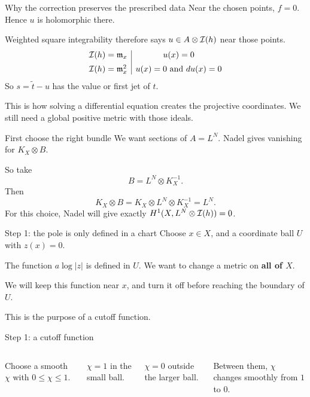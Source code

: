 \begin{frame}{Why the correction preserves the prescribed data}
Near the chosen points, \(f=0\). Hence \(u\) is holomorphic there.
\par\medskip
Weighted square integrability therefore says \(u\in A\otimes\mathcal I(h)\) near those points.
\[
\begin{array}{c|c}
\mathcal I(h)=\mathfrak m_x&u(x)=0\\[5pt]
\mathcal I(h)=\mathfrak m_x^2&u(x)=0\text{ and }du(x)=0
\end{array}
\]
So \(s=\widetilde t-u\) has the value or first jet of \(t\).
\par\medskip
This is how solving a differential equation creates the projective coordinates. We still need a global positive metric with those ideals.
\end{frame}

\begin{frame}{First choose the right bundle}
We want sections of \(A=L^N\). Nadel gives vanishing for \(K_X\otimes B\).
\par\bigskip
So take
\[
B=L^N\otimes K_X^{-1}.
\]
Then
\[
K_X\otimes B=K_X\otimes L^N\otimes K_X^{-1}=L^N.
\]
For this choice, Nadel will give exactly \(H^1(X,L^N\otimes\mathcal I(h))=0\).
\end{frame}

\begin{frame}{Step 1: the pole is only defined in a chart}
Choose \(x\in X\), and a coordinate ball \(U\) with \(z(x)=0\).
\par\bigskip
The function \(a\log|z|\) is defined in \(U\). We want to change a metric on \textbf{all of \(X\)}.
\par\bigskip
We will keep this function near \(x\), and turn it off before reaching the boundary of \(U\).
\par\medskip
This is the purpose of a cutoff function.
\end{frame}

\begin{frame}{Step 1: a cutoff function}
\begin{columns}[c]
\centering
{}
Choose a smooth \(\chi\) with \(0\le\chi\le1\).
\par\bigskip
\(\chi=1\) in the small ball.
\par\medskip
\(\chi=0\) outside the larger ball.
\par\medskip
Between them, \(\chi\) changes smoothly from \(1\) to \(0\).
\end{columns}
\end{frame}

